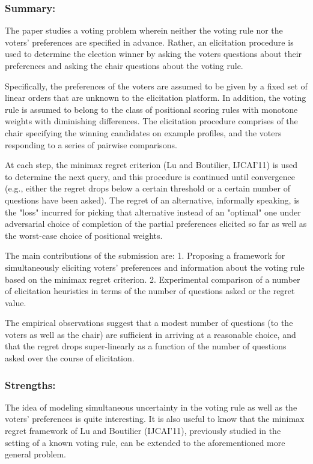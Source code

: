 \documentclass[version=3.21, pagesize, twoside=off, bibliography=totoc, DIV=calc, fontsize=12pt, a4paper]{scrartcl}
\begin{document}
\subsubsection*{Summary:}
The paper studies a voting problem wherein neither the voting rule nor the voters' preferences are specified in advance. Rather, an elicitation procedure is used to determine the election winner by asking the voters questions about their preferences and asking the chair questions about the voting rule.

Specifically, the preferences of the voters are assumed to be given by a fixed set of linear orders that are unknown to the elicitation platform. In addition, the voting rule is assumed to belong to the class of positional scoring rules with monotone weights with diminishing differences. The elicitation procedure comprises of the chair specifying the winning candidates on example profiles, and the voters responding to a series of pairwise comparisons.

At each step, the minimax regret criterion (Lu and Boutilier, IJCAI'11) is used to determine the next query, and this procedure is continued until convergence (e.g., either the regret drops below a certain threshold or a certain number of questions have been asked). The regret of an alternative, informally speaking, is the "loss" incurred for picking that alternative instead of an "optimal" one under adversarial choice of completion of the partial preferences elicited so far as well as the worst-case choice of positional weights.

The main contributions of the submission are:
1. Proposing a framework for simultaneously eliciting voters' preferences and information about the voting rule based on the minimax regret criterion.
2. Experimental comparison of a number of elicitation heuristics in terms of the number of questions asked or the regret value.

The empirical observations suggest that a modest number of questions (to the voters as well as the chair) are sufficient in arriving at a reasonable choice, and that the regret drops super-linearly as a function of the number of questions asked over the course of elicitation.
\subsubsection*{Strengths:}	The idea of modeling simultaneous uncertainty in the voting rule as well as the voters' preferences is quite interesting. It is also useful to know that the minimax regret framework of Lu and Boutilier (IJCAI'11), previously studied in the setting of a known voting rule, can be extended to the aforementioned more general problem.
\end{document}
